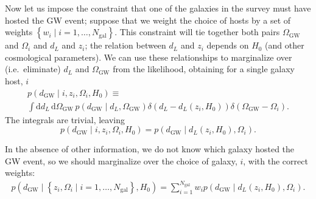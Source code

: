 \documentclass[modern]{article}
\newcommand{\dd}{\mathrm{d}}
\newcommand{\dEM}{d_{\mathrm{EM}}}
\newcommand{\dGW}{d_{\mathrm{GW}}}
\newcommand{\Ngal}{N_{\mathrm{gal}}}
\newcommand{\OGW}{\Omega_{\mathrm{GW}}}
\begin{document}
Now let us impose the constraint that one of the galaxies in the survey must
have hosted the \ac{GW} event; suppose that we weight the choice of hosts by a
set of weights $\left\{ w_i \mid i = 1, \ldots, \Ngal \right\}$.  This
constraint will tie together both pairs $\OGW$ and $\Omega_i$ and $d_L$ and
$z_i$; the relation between $d_L$ and $z_i$ depends on $H_0$ (and other
cosmological parameters).  We can use these relationships to marginalize over
(i.e.\ eliminate) $d_L$ and $\OGW$ from the likelihood, obtaining for a single
galaxy host, $i$
%
%
%
\begin{multline}
    p\left( \dGW \mid i, z_i, \Omega_i, H_0 \right) \equiv \\ \int \dd d_L \, \dd \OGW \, p\left( \dGW \mid d_L, \OGW \right)  \delta\left( d_L - d_L\left( z_i, H_0 \right) \right) \delta \left( \OGW - \Omega_i \right).
\end{multline}
%
The integrals are trivial\cite{Chen2017}, leaving
%
\begin{equation}
    p\left( \dGW \mid i, z_i, \Omega_i, H_0 \right) = p\left( \dGW \mid d_L\left( z_i, H_0 \right), \Omega_i \right).
\end{equation}

In the absence of other information, we do not know which galaxy hosted the
\ac{GW} event, so we should marginalize over the choice of galaxy, $i$, with the
correct weights:
%
\begin{multline}
    p\left( \dGW \mid \left\{ z_i, \Omega_i \mid i = 1, \ldots, \Ngal \right\}, H_0 \right) = \sum_{i = 1}^{\Ngal} w_i  p\left( \dGW \mid d_L\left( z_i, H_0 \right), \Omega_i \right).
\end{multline}
\end{document}
